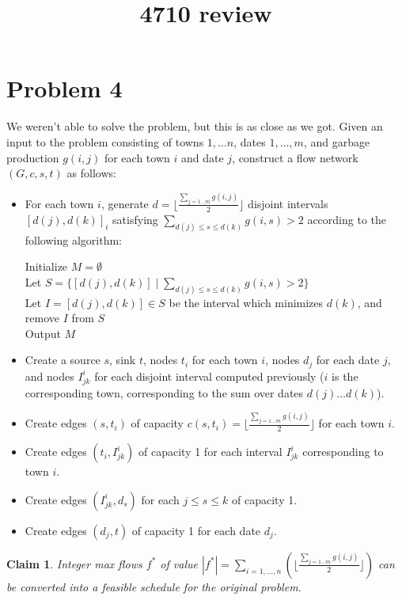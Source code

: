 \documentclass[12pt]{article}
\author{}
\title{4710 review}
\newtheorem{claim}{Claim}
\begin{document}
\section*{Problem 4}
We weren't able to solve the problem, but this is as close as we got. Given an input to the problem consisting of towns $1, \dots n$, dates $1, \dots, m$, and garbage production $g(i, j)$ for each town $i$ and date $j$, construct a flow network $(G, c, s, t)$ as follows:
\begin{itemize}
    \item For each town $i$, generate $d = \lfloor \frac{\sum_{j = 1\dots m} g(i,j)}{2} \rfloor$ disjoint intervals $[d(j),d(k)]_i$ satisfying $\sum\limits_{d(j) \leq s \leq d(k)} g(i,s) > 2$ according to the following algorithm: \\
    \begin{algorithm}[H]
    \SetAlgoLined
    Initialize $M = \emptyset$ \\
    Let $S = \{[d(j),d(k)] \; | \; \sum\limits_{d(j) \leq s \leq d(k)} g(i,s) > 2\}$\\
    Let $I = [d(j),d(k)] \in S$ be the interval which minimizes $d(k)$, and remove $I$ from $S$\\
    Output $M$
    \end{algorithm}
    \item Create a source $s$, sink $t$, nodes $t_i$ for each town $i$, nodes $d_j$ for each date $j$, and nodes $I^i_{jk}$ for each disjoint interval computed previously ($i$ is the corresponding town, corresponding to the sum over dates $d(j) \dots d(k)$).
    \item Create edges $(s,t_i)$ of capacity $c(s,t_i) = \lfloor \frac{\sum_{j = 1\dots m} g(i,j)}{2} \rfloor$ for each town $i$.
    \item Create edges $(t_i, I^i_{jk})$ of capacity 1 for each interval $I^i_{jk}$ corresponding to town $i$.
    \item Create edges $(I^i_{jk}, d_s)$ for each $j \leq s \leq k$ of capacity 1.
    \item Create edges $(d_j, t)$ of capacity 1 for each date $d_j$.\\
\end{itemize}
\begin{claim}
Integer max flows $f^*$ of value $|f^*| = \sum_{i=1,\dots,n} (\lfloor \frac{\sum_{j = 1\dots m} g(i,j)}{2} \rfloor)$ can be converted into a feasible schedule for the original problem.
\end{claim}
\end{document}
